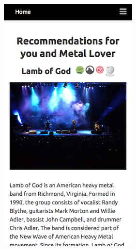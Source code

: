\documentclass{friggeri-cv}
\begin{document}
\begin{entrylist}
{\begin{minipage}{.3\columnwidth}
\end{minipage}
\quad
\begin{minipage}{.3\columnwidth}
  \includegraphics[width=\linewidth]{juggle_mobile-group_recommendations.png}
\end{minipage}
\vspace{1.5em}}


\end{entrylist}
\end{document}
